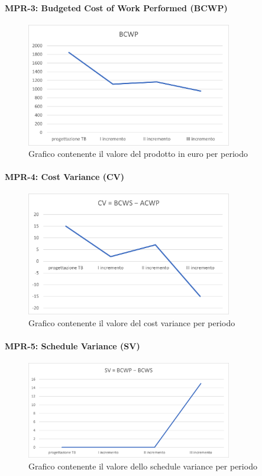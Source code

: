 \paragraph{MPR-3: Budgeted Cost of Work Performed (BCWP)}\label{_BCWP}
\begin{figure}[!htb]
    \centering
    \includegraphics[width=0.8\textwidth]{res/images/metriche_costi/BCWP.png}
    \caption{Grafico contenente il valore del prodotto in euro per periodo}
\end{figure}



\paragraph{MPR-4: Cost Variance (CV)}\label{_CV}
\begin{figure}[!htb]
    \centering
    \includegraphics[width=0.8\textwidth]{res/images/metriche_costi/CV.png}
    \caption{Grafico contenente il valore del cost variance per periodo}
\end{figure}
\newpage
\paragraph{MPR-5: Schedule Variance (SV)}\label{_SV}
\begin{figure}[!htb]
    \centering
    \includegraphics[width=0.8\textwidth]{res/images/metriche_costi/SV.png}
    \caption{Grafico contenente il valore dello schedule variance per periodo}
\end{figure} 

